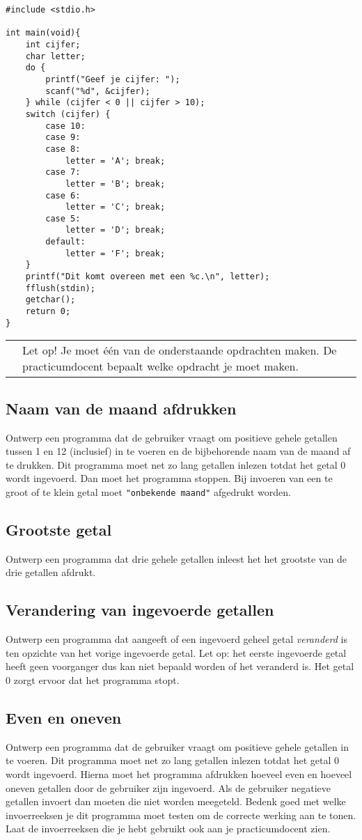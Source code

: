 \documentclass[a4paper,10pt,fleqn,twoside]{article}
\newcommand{\letop}{%
\vspace*{2ex}
\begin{mdframed}[outerlinewidth = 1 ,%
roundcorner = 4 pt,%
leftmargin = 40,%
rightmargin = 40,%
backgroundcolor = yellow!40,%
outerlinecolor = red!70!black,%
innertopmargin = \topskip,%
splittopskip = \topskip,%
]
\begin{tabularx}{\linewidth}{m{1cm}X}
\Large\leftpointright & Let op! Je moet één van de onderstaande opdrachten maken. De practicumdocent bepaalt welke opdracht je moet maken.
\end{tabularx}
\end{mdframed}
}
\begin{document}
\begin{lstlisting}
#include <stdio.h>

int main(void){
    int cijfer;
    char letter;
    do {
        printf("Geef je cijfer: ");
        scanf("%d", &cijfer);
    } while (cijfer < 0 || cijfer > 10);
    switch (cijfer) {
        case 10:
        case 9:
        case 8:
            letter = 'A'; break;
        case 7: 
            letter = 'B'; break;
        case 6: 
            letter = 'C'; break;
        case 5:
            letter = 'D'; break;
        default:
            letter = 'F'; break;
    }
    printf("Dit komt overeen met een %c.\n", letter);
    fflush(stdin);
    getchar();
    return 0;
}
\end{lstlisting}

\letop

\subsection{Naam van de maand afdrukken}
Ontwerp een programma dat de gebruiker vraagt om positieve gehele getallen tussen 1 en 12 (inclusief) in te voeren en de bijbehorende naam van de maand af te drukken. Dit programma moet net zo lang getallen inlezen totdat het getal 0 wordt ingevoerd. Dan moet het programma stoppen. Bij invoeren van een te groot of te klein getal moet \lstinline|"onbekende maand"| afgedrukt worden. 
 
\subsection{Grootste getal}
Ontwerp een programma dat drie gehele getallen inleest het het grootste van de drie getallen afdrukt.
 
\subsection{Verandering van ingevoerde getallen}
Ontwerp een programma dat aangeeft of een ingevoerd geheel getal \textsl{veranderd} is ten opzichte van het vorige ingevoerde getal. Let op: het eerste ingevoerde getal heeft geen voorganger dus kan niet bepaald worden of het veranderd is. Het getal 0 zorgt ervoor dat het programma stopt.


\subsection{Even en oneven}
Ontwerp een programma dat de gebruiker vraagt om positieve gehele getallen in te voeren. Dit programma moet net zo lang getallen inlezen totdat het getal 0 wordt ingevoerd. Hierna moet het programma afdrukken hoeveel even en hoeveel oneven getallen door de gebruiker zijn ingevoerd. Als de gebruiker negatieve getallen invoert dan moeten die niet worden meegeteld. Bedenk goed met welke invoerreeksen je dit programma moet testen om de correcte werking aan te tonen. Laat de invoerreeksen die je hebt gebruikt ook aan je practicumdocent zien.
\end{document}
